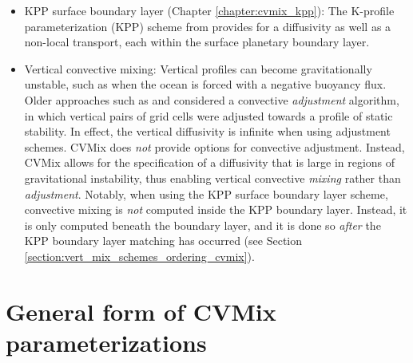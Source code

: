 \begin{itemize}
\item {\sc KPP surface boundary layer} (Chapter
  \ref{chapter:cvmix_kpp}): The K-profile parameterization (KPP)
  scheme from \cite{LargeKPP} provides for a diffusivity as well as a
  non-local transport, each within the surface planetary boundary
  layer.

\item {\sc Vertical convective mixing}: Vertical profiles can become
  gravitationally unstable, such as when the ocean is forced with a
  negative buoyancy flux.  Older approaches such as \cite{CoxModel}
  and \cite{Rahmstorf1993} considered a convective {\it adjustment}
  algorithm, in which vertical pairs of grid cells were adjusted
  towards a profile of static stability.  In effect, the vertical
  diffusivity is infinite when using adjustment schemes.  CVMix does
  {\it not} provide options for convective adjustment.  Instead, CVMix
  allows for the specification of a diffusivity that is large in
  regions of gravitational instability, thus enabling vertical
  convective {\it mixing} rather than {\it adjustment}.  Notably, when
  using the KPP surface boundary layer scheme, convective mixing is
  {\it not} computed inside the KPP boundary layer.  Instead, it is
  only computed beneath the boundary layer, and it is done so {\it
    after} the KPP boundary layer matching has occurred (see Section
  \ref{section:vert_mix_schemes_ordering_cvmix}).


\end{itemize}


\section{General form of CVMix parameterizations}
\label{section:vert_mix_schemes_general_cvmix}


